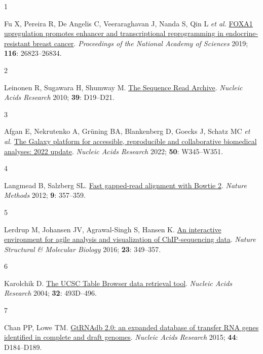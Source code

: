 \documentclass[
  12pt,
]{article}
\newlength{\cslhangindent}
\newlength{\csllabelwidth}
\newlength{\cslentryspacingunit} %
\newenvironment{CSLReferences}[2] %
 {%
  \setlength{\parindent}{0pt}
  \ifodd #1
  \let\oldpar\par
  \def\par{\hangindent=\cslhangindent\oldpar}
  \fi
  \setlength{\parskip}{#2\cslentryspacingunit}
 }%
 {}
\newcommand{\CSLLeftMargin}[1]{\parbox[t]{\csllabelwidth}{#1}}
\newcommand{\CSLRightInline}[1]{\parbox[t]{\linewidth - \csllabelwidth}{#1}\break}
\begin{document}
\hypertarget{refs}{}
\begin{CSLReferences}{0}{0}
\leavevmode{}%
\CSLLeftMargin{1 }%
\CSLRightInline{Fu X, Pereira R, De Angelis C, Veeraraghavan J, Nanda S, Qin L \emph{et al.} \href{https://doi.org/10.1073/pnas.1911584116}{FOXA1 upregulation promotes enhancer and transcriptional reprogramming in endocrine-resistant breast cancer}. \emph{Proceedings of the National Academy of Sciences} 2019; \textbf{116}: 26823--26834.}

\leavevmode{}%
\CSLLeftMargin{2 }%
\CSLRightInline{Leinonen R, Sugawara H, Shumway M. \href{https://doi.org/10.1093/nar/gkq1019}{The Sequence Read Archive}. \emph{Nucleic Acids Research} 2010; \textbf{39}: D19--D21.}

\leavevmode{}%
\CSLLeftMargin{3 }%
\CSLRightInline{Afgan E, Nekrutenko A, Grüning BA, Blankenberg D, Goecks J, Schatz MC \emph{et al.} \href{https://doi.org/10.1093/nar/gkac247}{The Galaxy platform for accessible, reproducible and collaborative biomedical analyses: 2022 update}. \emph{Nucleic Acids Research} 2022; \textbf{50}: W345--W351.}

\leavevmode{}%
\CSLLeftMargin{4 }%
\CSLRightInline{Langmead B, Salzberg SL. \href{https://doi.org/10.1038/nmeth.1923}{Fast gapped-read alignment with Bowtie 2}. \emph{Nature Methods} 2012; \textbf{9}: 357--359.}

\leavevmode{}%
\CSLLeftMargin{5 }%
\CSLRightInline{Lerdrup M, Johansen JV, Agrawal-Singh S, Hansen K. \href{https://doi.org/10.1038/nsmb.3180}{An interactive environment for agile analysis and visualization of ChIP-sequencing data}. \emph{Nature Structural \& Molecular Biology} 2016; \textbf{23}: 349--357.}

\leavevmode{}%
\CSLLeftMargin{6 }%
\CSLRightInline{Karolchik D. \href{https://doi.org/10.1093/nar/gkh103}{The UCSC Table Browser data retrieval tool}. \emph{Nucleic Acids Research} 2004; \textbf{32}: 493D--496.}

\leavevmode{}%
\CSLLeftMargin{7 }%
\CSLRightInline{Chan PP, Lowe TM. \href{https://doi.org/10.1093/nar/gkv1309}{GtRNAdb 2.0: an expanded database of transfer RNA genes identified in complete and draft genomes}. \emph{Nucleic Acids Research} 2015; \textbf{44}: D184--D189.}


\end{CSLReferences}
\end{document}
